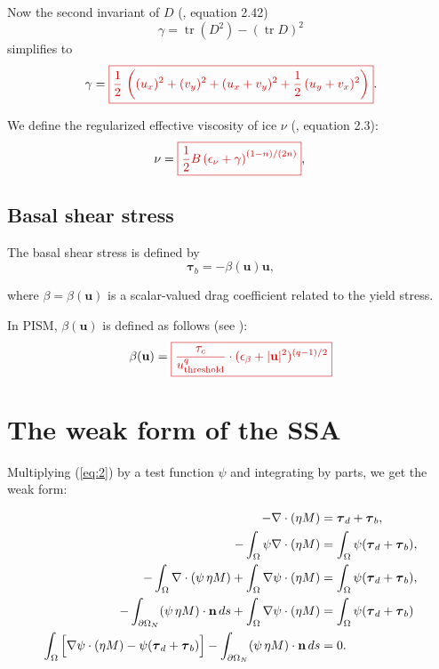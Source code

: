 \documentclass{amsart}
\DeclareMathOperator{\Tr}{tr}
\newcommand{\N}{\mathbf{n}}
\newcommand{\U}{\mathbf{u}}
\newcommand{\T}{\boldsymbol{\tau}}
\newcommand{\I}{\ensuremath{\int_{\Omega}}}
\newcommand{\boundary}{\partial \Omega_N}
\newcommand{\bI}{\ensuremath{\int_{\boundary}}}
\newcommand{\etaM}{\ensuremath{\eta M}}
\newcommand{\betaU}{\beta(\U)}
\newcommand{\basalshearstress}[1]{\T_{b#1}}
\newcommand{\taub}{\basalshearstress{}}
\newcommand{\drivingstress}[1]{\T_{d#1}}
\newcommand{\taud}{\drivingstress{}}
\newcommand{\highlight}[1]{{\color{red!80!black} \fbox{$ \displaystyle #1 $} }}
\begin{document}
Now the second invariant of $D$ (\cite{GreveBlatter2009}, equation 2.42)
\begin{equation*}
  \gamma = \Tr (D^2) - \left( \Tr D \right)^2
\end{equation*}
simplifies to
\begin{equation}
  \label{eq:4}
  \gamma = \highlight{ \frac{1}{2}\, \left( (u_x)^2 + (v_y)^2 + (u_x + v_y)^2 + \frac{1}{2}\,(u_y + v_x)^2 \right) }.
\end{equation}

We define the regularized effective viscosity of ice $\nu$ (\cite{SchoofStream}, equation 2.3):
\begin{equation}
  \label{eq:5}
  \nu = \highlight{ \frac{1}{2} B \left( \epsilon_{\nu} + \gamma \right)^{(1 - n) / (2n)} },\\
\end{equation}

\subsection{Basal shear stress}
\label{sec:beta}

The basal shear stress is defined by
\begin{equation}
  \label{eq:6}
  \taub =  - \betaU \U,
\end{equation}

where $\beta = \betaU$ is a scalar-valued drag coefficient related to the yield stress.

In PISM, $\betaU$ is defined as follows (see \cite{SchoofHindmarsh}):
\begin{equation}
  \label{eq:7}
  \betaU = \highlight{ \frac{\tau_c}{u_{\text{threshold}}^q}\cdot (\epsilon_{\beta} + |\U|^2)^{(q - 1) / 2} }
\end{equation}


\section{The weak form of the SSA}

Multiplying (\ref{eq:2}) by a test function $\psi$ and integrating by parts, we get the weak form:

\begin{align}
 - \nabla \cdot (\etaM) & = \taud + \taub,\notag \\
 - \I \psi \nabla \cdot (\etaM) & = \I \psi (\taud + \taub),\notag \\
 - \I \nabla \cdot (\psi\, \etaM) + \I \nabla \psi \cdot (\etaM) & = \I \psi (\taud + \taub),\notag \\
 - \bI (\psi\, \etaM)\cdot \N\, ds + \I \nabla \psi \cdot (\etaM) & = \I \psi (\taud + \taub)\notag \\
  \label{eq:8}
  \I \Big[\nabla \psi \cdot (\etaM) - \psi (\taud + \taub)\Big] - \bI (\psi\, \etaM) \cdot \N\, ds &= 0.
\end{align}
\end{document}
